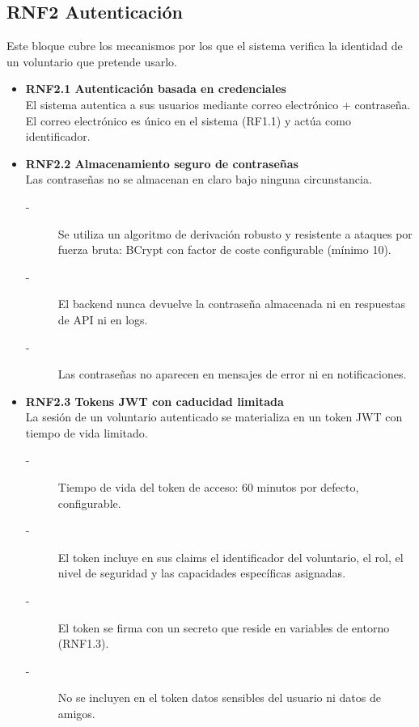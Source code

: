 \subsection{RNF2 Autenticación}
Este bloque cubre los mecanismos por los que el sistema verifica la
identidad de un voluntario que pretende usarlo.
\begin{itemize}
    \item \textbf{RNF2.1 Autenticación basada en credenciales} \\
    El sistema autentica a sus usuarios mediante correo electrónico + contraseña. El correo electrónico es único en el sistema (RF1.1) y actúa como
    identificador.


    \item \textbf{RNF2.2 Almacenamiento seguro de contraseñas} \\
    Las contraseñas no se almacenan en claro bajo ninguna circunstancia.
    \begin{description}
        \item[-] Se utiliza un algoritmo de derivación robusto y resistente a
        ataques por fuerza bruta: BCrypt con factor de coste configurable
        (mínimo 10). 
        \item[-] El backend nunca devuelve la contraseña almacenada ni en respuestas de API ni en logs.
        \item[-] Las contraseñas no aparecen en mensajes de error ni en notificaciones. 
    \end{description}


    \item \textbf{RNF2.3 Tokens JWT con caducidad limitada} \\
    La sesión de un voluntario autenticado se materializa en un token JWT
    con tiempo de vida limitado.
    \begin{description}
        \item[-] Tiempo de vida del token de acceso: 60 minutos por defecto, configurable. 
        \item[-] El token incluye en sus claims el identificador del voluntario, el
        rol, el nivel de seguridad y las capacidades específicas asignadas.
        \item[-] El token se firma con un secreto que reside en variables de entorno (RNF1.3).
        \item[-] No se incluyen en el token datos sensibles del usuario ni datos de amigos. 
    \end{description}



\end{itemize}
